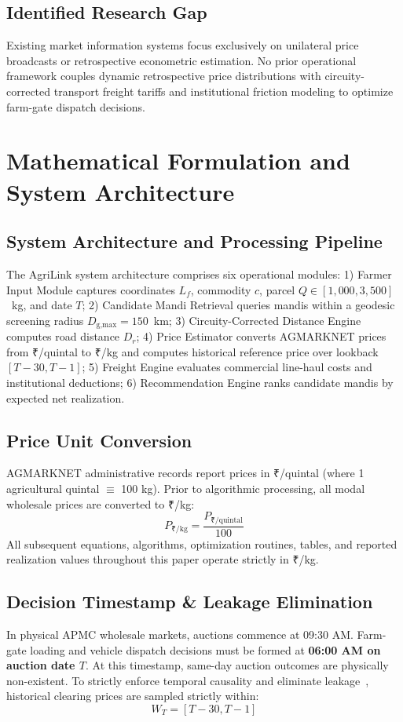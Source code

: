 \documentclass[journal]{IEEEtran}
\begin{document}
\subsection{Identified Research Gap}
Existing market information systems focus exclusively on unilateral price broadcasts or retrospective econometric estimation. No prior operational framework couples dynamic retrospective price distributions with circuity-corrected transport freight tariffs and institutional friction modeling to optimize farm-gate dispatch decisions.

\section{Mathematical Formulation and System Architecture}
\subsection{System Architecture and Processing Pipeline}
The AgriLink system architecture comprises six operational modules: 1) Farmer Input Module captures coordinates $L_f$, commodity $c$, parcel $Q \in [1,000, 3,500]$~kg, and date $T$; 2) Candidate Mandi Retrieval queries mandis within a geodesic screening radius $D_{\text{g,max}} = 150$~km; 3) Circuity-Corrected Distance Engine computes road distance $D_r$; 4) Price Estimator converts AGMARKNET prices from ₹/quintal to ₹/kg and computes historical reference price over lookback $[T-30, T-1]$; 5) Freight Engine evaluates commercial line-haul costs and institutional deductions; 6) Recommendation Engine ranks candidate mandis by expected net realization.

\subsection{Price Unit Conversion}
AGMARKNET administrative records report prices in ₹/quintal (where 1 agricultural quintal $\equiv$ 100 kg). Prior to algorithmic processing, all modal wholesale prices are converted to ₹/kg:
\begin{equation}
P_{\text{₹/kg}} = \frac{P_{\text{₹/quintal}}}{100}
\label{eq:price_conv}
\end{equation}
All subsequent equations, algorithms, optimization routines, tables, and reported realization values throughout this paper operate strictly in ₹/kg.

\subsection{Decision Timestamp \& Leakage Elimination}
In physical APMC wholesale markets, auctions commence at 09:30 AM. Farm-gate loading and vehicle dispatch decisions must be formed at \textbf{06:00 AM on auction date $T$}. At this timestamp, same-day auction outcomes are physically non-existent. To strictly enforce temporal causality and eliminate leakage~\cite{kaufman2012leakage}, historical clearing prices are sampled strictly within:
\begin{equation}
W_T = [T - 30, T - 1]
\label{eq:lookback}
\end{equation}
\end{document}
